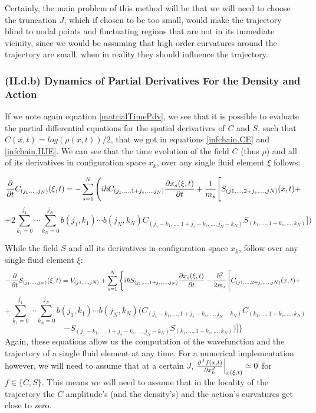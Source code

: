 \documentclass[11pt, a4paper]{article} %
\begin{document}
Certainly, the main problem of this method will be that we will need to choose the truncation $J$, which if chosen to be too small, would make the trajectory blind to nodal points and fluctuating regions that are not in its immediate vicinity, since we would be assuming that high order curvatures around the trajectory are small, when in reality they should influence the trajectory.

\subsubsection*{(II.d.b) Dynamics of Partial Derivatives For the Density and Action}

If we note again equation \eqref{matrialTimePdv}, we see that it is possible to evaluate the partial differential equations for the spatial derivatives of $C$ and $S$, such that $C(x,t)=log(\rho(x,t))/2$, that we got in equations \eqref{infchain.CE} and \eqref{infchain.HJE}. We can see that the time evolution of the field $C$ (thus $\rho$) and all of its derivatives in configuration space $x_k$, over any single fluid element $\xi$ follows:

\begin{equation}\label{infchain.CE.L}
\pdv{}{t}C_{(j_1,...,j_N)}(\xi,t)=-\sum_{s=1}^N \Bigg(i\hbar C_{(j_1,...,1+j_s,...,j_N)}\pdv{x_s(\xi,t)}{t} + \frac{1}{m_s} \Bigg[S_{(j1,...,2+j_s,...,jN)}(x,t)+
\end{equation}
$$
+2 \sum_{k_1=0}^{j_1}\cdots\sum_{k_N=0}^{j_N} b(j_1,k_1)\cdots b(j_N,k_N)C_{(j_1-k_1,...,1+j_s-k_s,...,j_N-k_N)}S_{(k_1,...,1+k_s,...,k_N)} \Bigg]\bigg)
$$

While the field $S$ and all its derivatives in configuration space $x_k$, follow over any single fluid element $\xi$:
\begin{equation}\label{infchain.HJE.L}
-\pdv{}{t}S_{(j_1,...,j_N)}(\xi,t)=V_{(j1,...,jN)}+\sum_{s=1}^N\Bigg\{ i\hbar S_{(j_1,...,1+j_s,...,j_N)}\pdv{x_s(\xi,t)}{t}-\frac{\hbar^2}{2m_s} \Bigg[ C_{(j1,...,2+j_s,...,jN)}(x,t)+
\end{equation}
$$
+\sum_{k_1=0}^{j_1}\cdots\sum_{k_N=0}^{j_N} b(j_1,k_1)\cdots b(j_N,k_N) \Bigg( C_{(j_1-k_1,...,1+j_s-k_s,...,j_N-k_N)}C_{(k_1,...,1+k_s,...,k_N)} 
$$
$$
-S_{(j_1-k_1,...,1+j_s-k_s,...,j_N-k_N)}S_{(k_1,...,1+k_s,...,k_N)}  \Bigg)\Bigg]\Bigg\}
$$
Again, these equations allow us the computation of the wavefunction and the trajectory of a single fluid element at any time. For a numerical implementation however, we will need to assume that at a certain $J$, $\pdv[J]{f(x,t)}{x_k}\Big\rvert_{x(\xi,t)}\simeq 0$ for $f\in\{ C,S\}$. This means we will need to assume that in the locality of the trajectory the $C$ amplitude's (and the density's) and the action's curvatures get close to zero.
\end{document}
